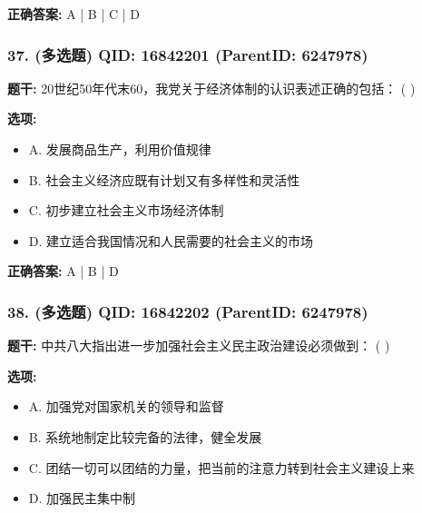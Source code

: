 \documentclass[12pt,UTF8]{ctexart}
\begin{document}
\textbf{正确答案:}
A | B | C | D

\vspace{0.3em}\hrulefill\vspace{0.7em}

\subsubsection*{37. (多选题) \small QID: 16842201 (ParentID: 6247978)}

\textbf{题干:}
20世纪50年代末60，我党关于经济体制的认识表述正确的包括： ( )



\textbf{选项:}
\begin{itemize}[leftmargin=*]

  \item A. 发展商品生产，利用价值规律

  \item B. 社会主义经济应既有计划又有多样性和灵活性

  \item C. 初步建立社会主义市场经济体制

  \item D. 建立适合我国情况和人民需要的社会主义的市场

\end{itemize}

\textbf{正确答案:}
A | B | D

\vspace{0.3em}\hrulefill\vspace{0.7em}

\subsubsection*{38. (多选题) \small QID: 16842202 (ParentID: 6247978)}

\textbf{题干:}
中共八大指出进一步加强社会主义民主政治建设必须做到： ( )



\textbf{选项:}
\begin{itemize}[leftmargin=*]

  \item A. 加强党对国家机关的领导和监督

  \item B. 系统地制定比较完备的法律，健全发展

  \item C. 团结一切可以团结的力量，把当前的注意力转到社会主义建设上来

  \item D. 加强民主集中制

\end{itemize}
\end{document}
